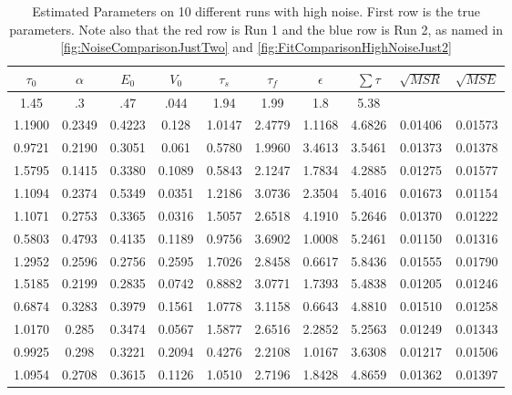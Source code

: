 \begin{table}[t]
\centering
\begin{tabular}{|c | c | c | c | c | c | c | c | c | c |}
\hline 
$\tau_0$ & $\alpha$ & $E_0$    & $V_0$    & $\tau_s$ & $\tau_f$ & $\epsilon$  & $ \sum \tau $ & $\sqrt{MSR}$  & $\sqrt{MSE}$\\
\hline 
\rowcolor[gray]{.8}
1.45 & .3 & .47 & .044 & 1.94 & 1.99 & 1.8  & 5.38 &  & \\
\hline 
\hline 
1.1900 & 0.2349 & 0.4223 & 0.128  & 1.0147 & 2.4779 & 1.1168 & 4.6826 &0.01406 &0.01573   \\
0.9721 & 0.2190 & 0.3051 & 0.061  & 0.5780 & 1.9960 & 3.4613 & 3.5461 &0.01373 &0.01378   \\
1.5795 & 0.1415 & 0.3380 & 0.1089 & 0.5843 & 2.1247 & 1.7834 & 4.2885 &0.01275 &0.01577   \\
1.1094 & 0.2374 & 0.5349 & 0.0351 & 1.2186 & 3.0736 & 2.3504 & 5.4016 &0.01673 &0.01154    \\
1.1071 & 0.2753 & 0.3365 & 0.0316 & 1.5057 & 2.6518 & 4.1910 & 5.2646 &0.01370 &0.01222   \\
0.5803 & 0.4793 & 0.4135 & 0.1189 & 0.9756 & 3.6902 & 1.0008 & 5.2461 &0.01150 &0.01316   \\
\rowcolor[rgb]{.9,.5,.5}
1.2952 & 0.2596 & 0.2756 & 0.2595 & 1.7026 & 2.8458 & 0.6617 & 5.8436 &0.01555 &0.01790   \\
\rowcolor[rgb]{.5,.5,.9}
1.5185 & 0.2199 & 0.2835 & 0.0742 & 0.8882 & 3.0771 & 1.7393 & 5.4838 &0.01205 &0.01246   \\
0.6874 & 0.3283 & 0.3979 & 0.1561 & 1.0778 & 3.1158 & 0.6643 & 4.8810 &0.01510 &0.01258   \\
1.0170 & 0.285  & 0.3474 & 0.0567 & 1.5877 & 2.6516 & 2.2852 & 5.2563 &0.01249 &0.01343   \\
0.9925 & 0.298  & 0.3221 & 0.2094 & 0.4276 & 2.2108 & 1.0167 & 3.6308 &0.01217 &0.01506   \\
\hline                                                                          
1.0954 & 0.2708 & 0.3615 & 0.1126 & 1.0510 & 2.7196 & 1.8428 & 4.8659 &0.01362 &0.01397\\
\hline 
\end{tabular}
\caption{Estimated Parameters on 10 different runs with high noise. First row is the true parameters.
Note also that the red row is Run 1 and the blue row is Run 2, as named in  \autoref{fig:NoiseComparisonJustTwo}
and \autoref{fig:FitComparisonHighNoiseJust2}}
\label{tab:HighNoiseResults} 
\end{table}

